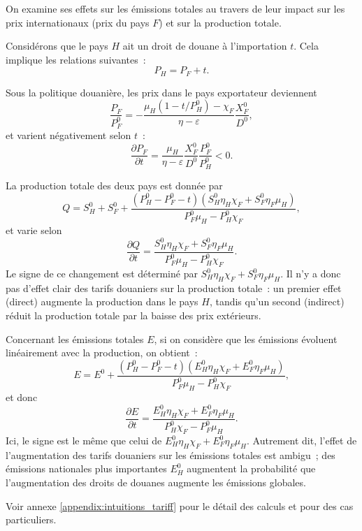 On examine ses effets sur les émissions totales au travers de leur impact sur les prix internationaux (prix du pays $F$) et sur la production totale.

Considérons que le pays $H$ ait un droit de douane à l'importation $t$. Cela implique les relations suivantes~:
\begin{equation}
    P_H = P_F + t.
\end{equation}

Sous la politique douanière, les prix dans le pays exportateur deviennent
\begin{equation}
    \frac{P_F}{P_F^0} = -\frac{\mu_H (1 - t/P_H^0) - \chi_F}{\eta - \varepsilon}\frac{X_F^0}{D^0},
\end{equation}
et varient négativement selon $t$~:
\begin{equation}
    \frac{\partial P_F}{\partial t} = \frac{\mu_H}{\eta - \varepsilon} \frac{X_F^0}{D^0} \frac{P_F^0}{P_H^0} < 0.
\end{equation}

La production totale des deux pays est donnée par
\begin{equation}
    Q = S_H^0 + S_F^0 + \frac{(P_H^0 - P_F^0 - t)(S_H^0 \eta_H \chi_F + S_F^0 \eta_F \mu_H)}{P_F^0 \mu_H - P_H^0 \chi_F},
\end{equation}
et varie selon
\begin{equation}
    \frac{\partial Q}{\partial t} = \frac{S_H^0 \eta_H \chi_F + S_F^0 \eta_F \mu_H}{P_F^0 \mu_H - P_H^0 \chi_F}.
\end{equation}
Le signe de ce changement est déterminé par $S_H^0 \eta_H \chi_F + S_F^0 \eta_F \mu_H$. Il n'y a donc pas d'effet clair des tarifs douaniers sur la production totale~: un premier effet (direct) augmente la production dans le pays $H$, tandis qu'un second (indirect) réduit la production totale par la baisse des prix extérieurs.

Concernant les émissions totales $E$, si on considère que les émissions évoluent linéairement avec la production, on obtient~:
\begin{equation}
    E = E^0 + \frac{(P_H^0 - P_F^0 - t)(E_H^0 \eta_H \chi_F + E_F^0 \eta_F \mu_H)}{P_F^0 \mu_H - P_H^0 \chi_F},
\end{equation}
et donc
\begin{equation}\label{eq:eq_intuition_delta_em}
    \frac{\partial E}{\partial t} = \frac{E_H^0 \eta_H \chi_F + E_F^0 \eta_F \mu_H}{P_H^0 \chi_F - P_F^0 \mu_H}.
\end{equation}
Ici, le signe est le même que celui de $E_H^0 \eta_H \chi_F + E_F^0 \eta_F \mu_H$. Autrement dit, l'effet de l'augmentation des tarifs douaniers sur les émissions totales est ambigu~; des émissions nationales plus importantes $E_H^0$ augmentent la probabilité que l'augmentation des droits de douanes augmente les émissions globales.

Voir annexe \ref{appendix:intuitions_tariff} pour le détail des calculs et pour des cas particuliers.
